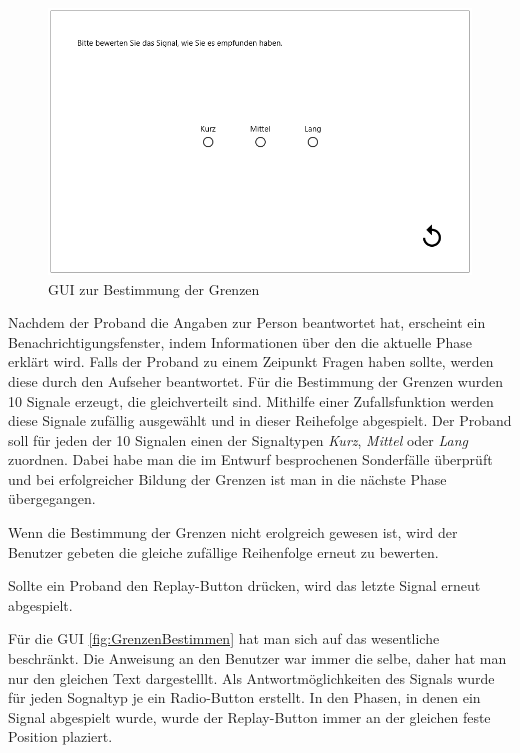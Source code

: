\begin{figure}
	\centering
    \includegraphics[width=\textwidth]{pics/gui/GrenzenBestimmen.png}
    \caption{GUI zur Bestimmung der Grenzen}
    \label{fig:GrenzenBestimmen}
\end{figure}

Nachdem der Proband die Angaben zur Person beantwortet hat, erscheint ein Benachrichtigungsfenster, indem Informationen {\"u}ber den die aktuelle Phase erkl{\"a}rt wird. 
Falls der Proband zu einem Zeipunkt Fragen haben sollte, werden diese durch den Aufseher beantwortet.
F{\"u}r die Bestimmung der Grenzen wurden 10 Signale erzeugt, die gleichverteilt sind. 
Mithilfe einer Zufallsfunktion werden diese Signale zuf{\"a}llig ausgew{\"a}hlt und in dieser Reihefolge abgespielt. 
Der Proband soll f{\"u}r jeden der 10 Signalen einen der Signaltypen \textit{Kurz}, \textit{Mittel} oder \textit{Lang} zuordnen. 
Dabei habe man die im Entwurf besprochenen Sonderf{\"a}lle {\"u}berpr{\"u}ft und bei erfolgreicher Bildung der Grenzen ist man in die n{\"a}chste Phase {\"u}bergegangen.

Wenn die Bestimmung der Grenzen nicht erolgreich gewesen ist, wird der Benutzer gebeten die gleiche zuf{\"a}llige Reihenfolge erneut zu bewerten. 

Sollte ein Proband den Replay-Button dr{\"u}cken, wird das letzte Signal erneut abgespielt.

F{\"u}r die GUI \autoref{fig:GrenzenBestimmen} hat man sich auf das wesentliche beschr{\"a}nkt. Die Anweisung an den Benutzer war immer die selbe, daher hat man nur den gleichen Text dargestelllt. Als Antwortm{\"o}glichkeiten des Signals wurde für jeden Sognaltyp je ein Radio-Button erstellt. 
In den Phasen, in denen ein Signal abgespielt wurde, wurde der Replay-Button immer an der gleichen feste Position plaziert. 

